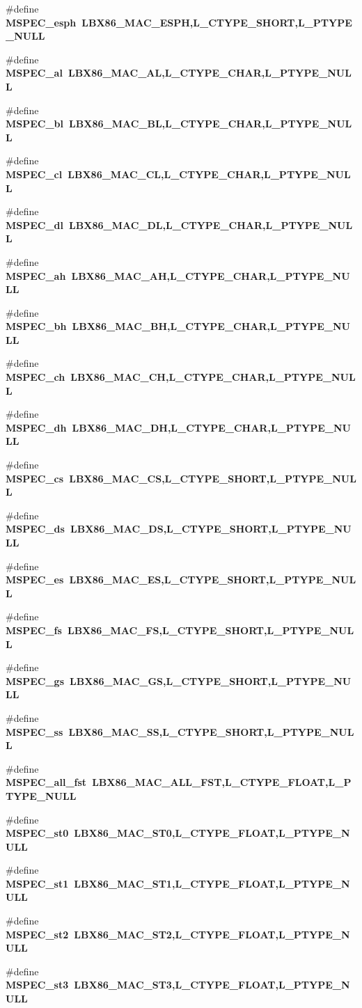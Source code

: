 \begin{CompactItemize}
\item 
\#define \bf{MSPEC\_\-esph}~LBX86\_\-MAC\_\-ESPH,L\_\-CTYPE\_\-SHORT,L\_\-PTYPE\_\-NULL
\item 
\#define \bf{MSPEC\_\-al}~LBX86\_\-MAC\_\-AL,L\_\-CTYPE\_\-CHAR,L\_\-PTYPE\_\-NULL
\item 
\#define \bf{MSPEC\_\-bl}~LBX86\_\-MAC\_\-BL,L\_\-CTYPE\_\-CHAR,L\_\-PTYPE\_\-NULL
\item 
\#define \bf{MSPEC\_\-cl}~LBX86\_\-MAC\_\-CL,L\_\-CTYPE\_\-CHAR,L\_\-PTYPE\_\-NULL
\item 
\#define \bf{MSPEC\_\-dl}~LBX86\_\-MAC\_\-DL,L\_\-CTYPE\_\-CHAR,L\_\-PTYPE\_\-NULL
\item 
\#define \bf{MSPEC\_\-ah}~LBX86\_\-MAC\_\-AH,L\_\-CTYPE\_\-CHAR,L\_\-PTYPE\_\-NULL
\item 
\#define \bf{MSPEC\_\-bh}~LBX86\_\-MAC\_\-BH,L\_\-CTYPE\_\-CHAR,L\_\-PTYPE\_\-NULL
\item 
\#define \bf{MSPEC\_\-ch}~LBX86\_\-MAC\_\-CH,L\_\-CTYPE\_\-CHAR,L\_\-PTYPE\_\-NULL
\item 
\#define \bf{MSPEC\_\-dh}~LBX86\_\-MAC\_\-DH,L\_\-CTYPE\_\-CHAR,L\_\-PTYPE\_\-NULL
\item 
\#define \bf{MSPEC\_\-cs}~LBX86\_\-MAC\_\-CS,L\_\-CTYPE\_\-SHORT,L\_\-PTYPE\_\-NULL
\item 
\#define \bf{MSPEC\_\-ds}~LBX86\_\-MAC\_\-DS,L\_\-CTYPE\_\-SHORT,L\_\-PTYPE\_\-NULL
\item 
\#define \bf{MSPEC\_\-es}~LBX86\_\-MAC\_\-ES,L\_\-CTYPE\_\-SHORT,L\_\-PTYPE\_\-NULL
\item 
\#define \bf{MSPEC\_\-fs}~LBX86\_\-MAC\_\-FS,L\_\-CTYPE\_\-SHORT,L\_\-PTYPE\_\-NULL
\item 
\#define \bf{MSPEC\_\-gs}~LBX86\_\-MAC\_\-GS,L\_\-CTYPE\_\-SHORT,L\_\-PTYPE\_\-NULL
\item 
\#define \bf{MSPEC\_\-ss}~LBX86\_\-MAC\_\-SS,L\_\-CTYPE\_\-SHORT,L\_\-PTYPE\_\-NULL
\item 
\#define \bf{MSPEC\_\-all\_\-fst}~LBX86\_\-MAC\_\-ALL\_\-FST,L\_\-CTYPE\_\-FLOAT,L\_\-PTYPE\_\-NULL
\item 
\#define \bf{MSPEC\_\-st0}~LBX86\_\-MAC\_\-ST0,L\_\-CTYPE\_\-FLOAT,L\_\-PTYPE\_\-NULL
\item 
\#define \bf{MSPEC\_\-st1}~LBX86\_\-MAC\_\-ST1,L\_\-CTYPE\_\-FLOAT,L\_\-PTYPE\_\-NULL
\item 
\#define \bf{MSPEC\_\-st2}~LBX86\_\-MAC\_\-ST2,L\_\-CTYPE\_\-FLOAT,L\_\-PTYPE\_\-NULL
\item 
\#define \bf{MSPEC\_\-st3}~LBX86\_\-MAC\_\-ST3,L\_\-CTYPE\_\-FLOAT,L\_\-PTYPE\_\-NULL

\end{CompactItemize}
